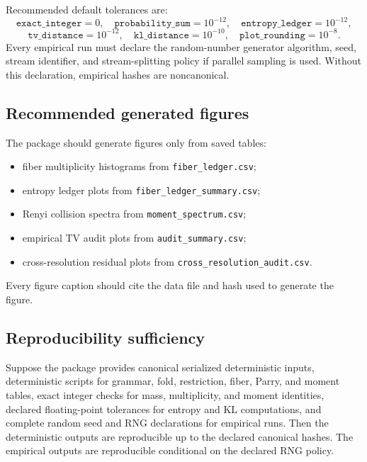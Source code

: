 Recommended default tolerances are:
\[
\texttt{exact\_integer}=0,\quad
\texttt{probability\_sum}=10^{-12},\quad
\texttt{entropy\_ledger}=10^{-12},
\]
\[
\texttt{tv\_distance}=10^{-12},\quad
\texttt{kl\_distance}=10^{-10},\quad
\texttt{plot\_rounding}=10^{-8}.
\]
Every empirical run must declare the random-number generator algorithm, seed, stream identifier, and stream-splitting policy if parallel sampling is used.  Without this declaration, empirical hashes are noncanonical.

\subsection{Recommended generated figures}

The package should generate figures only from saved tables:
\begin{itemize}[leftmargin=2em]
\item fiber multiplicity histograms from \texttt{fiber\_ledger.csv};
\item entropy ledger plots from \texttt{fiber\_ledger\_summary.csv};
\item Renyi collision spectra from \texttt{moment\_spectrum.csv};
\item empirical TV audit plots from \texttt{audit\_summary.csv};
\item cross-resolution residual plots from \texttt{cross\_resolution\_audit.csv}.
\end{itemize}
Every figure caption should cite the data file and hash used to generate the figure.

\subsection{Reproducibility sufficiency}

\begin{theorem}
\label{thm:reproducibility-sufficiency}
Suppose the package provides canonical serialized deterministic inputs, deterministic scripts for grammar, fold, restriction, fiber, Parry, and moment tables, exact integer checks for mass, multiplicity, and moment identities, declared floating-point tolerances for entropy and KL computations, and complete random seed and RNG declarations for empirical runs.  Then the deterministic outputs are reproducible up to the declared canonical hashes.  The empirical outputs are reproducible conditional on the declared RNG policy.
\end{theorem}


